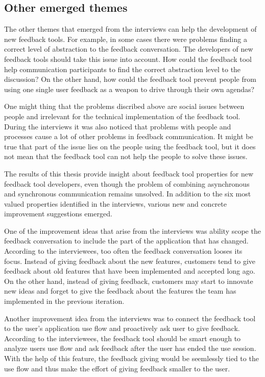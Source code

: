 \documentclass[english,12pt,a4paper,pdftex]{article}
\begin{document}
\subsection{Other emerged themes}

The other themes that emerged from the interviews can help the development of new feedback tools. For example, in some cases there were problems finding a correct level of abstraction to the feedback conversation. The developers of new feedback tools should take this issue into account. How could the feedback tool help communication participants to find the correct abstraction level to the discussion? On the other hand, how could the feedback tool prevent people from using one single user feedback as a weapon to drive through their own agendas?

One might thing that the problems discribed above are social issues between people and irrelevant for the technical implementation of the feedback tool. During the interviews it was also noticed that problems with people and processes cause a lot of other problems in feedback communication. It might be true that part of the issue lies on the people using the feedback tool, but it does not mean that the feedback tool can not help the people to solve these issues.

The results of this thesis provide insight about feedback tool properties for new feedback tool developers, even though the problem of combining asynchronous and synchronous communication remains unsolved. In addition to the six most valued properties identified in the interviews, various new and concrete improvement suggestions emerged.

One of the improvement ideas that arise from the interviews was ability scope the feedback conversation to include the part of the application that has changed. According to the interviewees, too often the feedback conversation looses its focus. Instead of giving feedback about the new features, customers tend to give feedback about old features that have been implemented and accepted long ago. On the other hand, instead of giving feedback, customers may start to innovate new ideas and forget to give the feedback about the features the team has implemented in the previous iteration.

Another improvement idea from the interviews was to connect the feedback tool to the user's application use flow and proactively ask user to give feedback. According to the interviewees, the feedback tool should be smart enough to analyze users use flow and ask feedback after the user has ended the use session. With the help of this feature, the feedback giving would be seemlessly tied to the use flow and thus make the effort of giving feedback smaller to the user.
\end{document}
